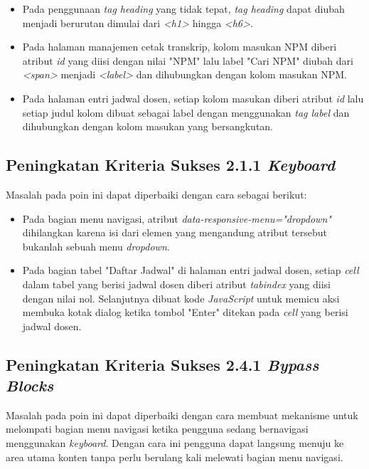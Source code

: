 \begin{itemize}
    \item Pada penggunaan \textit{tag heading} yang tidak tepat, \textit{tag heading} dapat diubah menjadi berurutan dimulai dari \textit{<h1>} hingga \textit{<h6>}.
    \item Pada halaman manajemen cetak transkrip, kolom masukan NPM diberi atribut \textit{id} yang diisi dengan nilai "NPM" lalu label "Cari NPM" diubah dari \textit{<span>} menjadi \textit{<label>} dan dihubungkan dengan kolom masukan NPM.
    \item Pada halaman entri jadwal dosen, setiap kolom masukan diberi atribut \textit{id} lalu setiap judul kolom dibuat sebagai label dengan menggunakan \textit{tag label} dan dihubungkan dengan kolom masukan yang bersangkutan.
\end{itemize}

\subsection{Peningkatan Kriteria Sukses 2.1.1 \textit{Keyboard}}
\label{subsec:peningkatan_kriteria_sukses_2.1.1}
Masalah pada poin ini dapat diperbaiki dengan cara sebagai berikut:

\begin{itemize}
    \item Pada bagian menu navigasi, atribut \textit{data-responsive-menu="dropdown"} dihilangkan karena isi dari elemen yang mengandung atribut tersebut bukanlah sebuah menu \textit{dropdown}.
    \item Pada bagian tabel "Daftar Jadwal" di halaman entri jadwal dosen, setiap \textit{cell} dalam tabel yang berisi jadwal dosen diberi atribut \textit{tabindex} yang diisi dengan nilai nol. Selanjutnya dibuat kode \textit{JavaScript} untuk memicu aksi membuka kotak dialog ketika tombol "Enter" ditekan pada \textit{cell} yang berisi jadwal dosen.
\end{itemize}

\subsection{Peningkatan Kriteria Sukses 2.4.1 \textit{Bypass Blocks}}
\label{subsec:peningkatan_kriteria_sukses_2.4.1}
Masalah pada poin ini dapat diperbaiki dengan cara membuat mekanisme untuk melompati bagian menu navigasi ketika pengguna sedang bernavigasi menggunakan \textit{keyboard}. Dengan cara ini pengguna dapat langsung menuju ke area utama konten tanpa perlu berulang kali melewati bagian menu navigasi.

